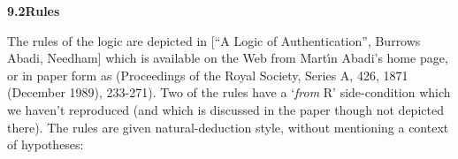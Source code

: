 \textbf{{\large 9.2\tab Rules}}


The rules of the logic are depicted in [``A Logic of Authentication'', Burrows Abadi, Needham] which is available on the Web from Mart\'{\i}n Abadi's home page, or in paper form as (Proceedings of the Royal Society, Series A, 426, 1871 (December 1989), 233-271). Two of the rules have a `\textit{from} R' side-condition which we haven't reproduced (and which is discussed in the paper though not depicted there). The rules are given natural-deduction style, without mentioning a context of hypotheses:\\


%
%
%
%
%
%
%
%
%
%
%
%
%
%
